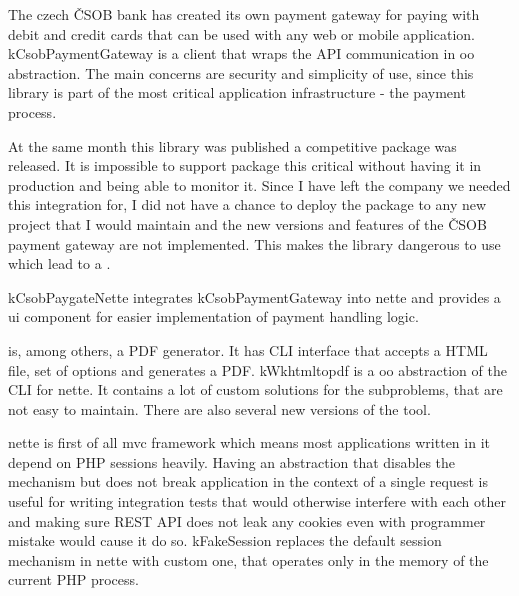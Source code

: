  \label{sec:state:csob-payment-gateway}

The czech ČSOB bank has created its own payment gateway for paying with debit and credit cards that can be used with any web or mobile application. \gls{kCsobPaymentGateway} is a client that wraps the API communication in \gls{oo} abstraction. The main concerns are security and simplicity of use, since this library is part of the most critical application infrastructure - the payment process.

At the same month this library was published a competitive package  was released. It is impossible to support package this critical without having it in production and being able to monitor it. Since I have left the company we needed this integration for, I did not have a chance to deploy the package to any new project that I would maintain and the new versions and features of the ČSOB payment gateway are not implemented. This makes the library dangerous to use which lead to a .

 \label{sec:state:csob-paygate-nette}

\gls{kCsobPaygateNette} integrates \gls{kCsobPaymentGateway} into \gls{nette} and provides a \gls{ui} component for easier implementation of payment handling logic.

 \label{sec:state:wkhtmltopdf}

 is, among others, a PDF generator. It has CLI interface that accepts a HTML file, set of options and generates a PDF. \gls{kWkhtmltopdf} is a \gls{oo} abstraction of the CLI for \gls{nette}. It contains a lot of custom solutions for the subproblems, that are not easy to maintain. There are also several new versions of the tool.

 \label{sec:state:fake-session}

\gls{nette} is first of all \gls{mvc} framework which means most applications written in it depend on PHP sessions heavily. Having an abstraction that disables the mechanism but does not break application in the context of a single request is useful for writing integration tests that would otherwise interfere with each other and making sure REST API does not leak any cookies even with programmer mistake would cause it do so. \gls{kFakeSession} replaces the default session mechanism in \gls{nette} with custom one, that operates only in the memory of the current PHP process.

